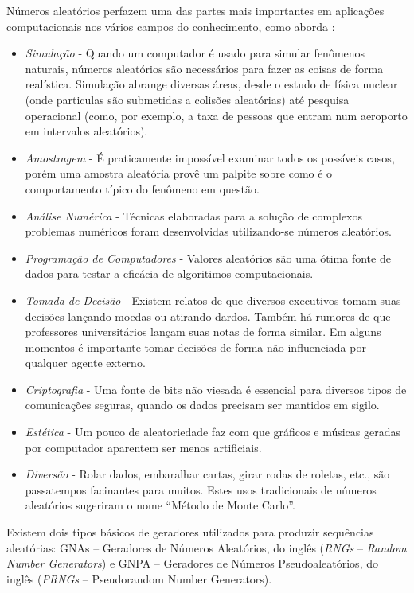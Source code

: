 Números aleatórios perfazem uma das partes mais importantes em aplicações computacionais nos vários campos do conhecimento, como aborda \citep{Knuth:98}:
\begin{itemize}
     \item \textit{Simulação} - Quando um computador é usado para simular fenômenos naturais, números aleatórios são necessários para fazer as coisas de forma realística. Simulação abrange diversas áreas, desde o estudo de física nuclear (onde particulas são submetidas a colisões aleatórias) até pesquisa operacional (como, por exemplo, a taxa de pessoas que entram num aeroporto em intervalos aleatórios).
     \item \textit{Amostragem} - É praticamente impossível examinar todos os possíveis casos, porém uma amostra aleatória provê um palpite sobre como é o comportamento típico do fenômeno em questão.
     \item \textit{Análise Numérica} - Técnicas elaboradas para a solução de complexos problemas numéricos foram desenvolvidas utilizando-se números aleatórios.
     \item \textit{Programação de Computadores} - Valores aleatórios são uma ótima fonte de dados para testar a eficácia de algoritimos computacionais.
     \item \textit{Tomada de Decisão} - Existem relatos de que diversos executivos tomam suas decisões lançando moedas ou atirando dardos. Também há rumores de que professores universitários lançam suas notas de forma similar. Em alguns momentos é importante tomar decisões de forma não influenciada por qualquer agente externo.
     \item \textit{Criptografia} - Uma fonte de bits não viesada é essencial para diversos tipos de comunicações seguras, quando os dados precisam ser mantidos em sigilo.
     \item \textit{Estética} - Um pouco de aleatoriedade faz com que gráficos e músicas geradas por computador aparentem ser menos artificiais.
     \item \textit{Diversão} - Rolar dados, embaralhar cartas, girar rodas de roletas, etc., são passatempos facinantes para muitos. Estes usos tradicionais de números aleatórios sugeriram o nome ``Método de Monte Carlo''.
    \end{itemize}

Existem dois tipos básicos de geradores utilizados para produzir sequências aleatórias: GNAs -- Geradores de Números Aleatórios, do inglês (\textit{RNGs} -- \textit{Random Number Generators}) e GNPA -- Geradores de Números Pseudoaleatórios, do inglês (\textit{PRNGs} -- Pseudorandom Number Generators).

